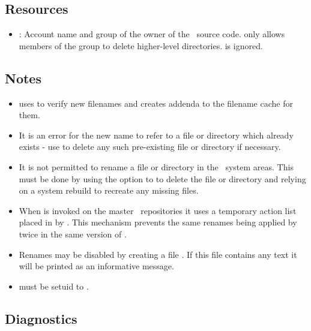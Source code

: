 \subsection*{Resources}

\begin{itemize}
\item
   : Account name and group of the owner of the
   \aipspp\ source code.   only allows members of the 
   group to delete higher-level directories.   is
   ignored.
\end{itemize}

\subsection*{Notes}

\begin{itemize}
\item
    uses  to verify new filenames and creates addenda to
   the  filename cache for them.

\item
   It is an error for the new name to refer to a file or directory which
   already exists - use  to delete any such pre-existing file or
   directory if necessary.

\item
   It is not permitted to rename a file or directory in the \aipspp\ system
   areas.  This must be done by using the  option to  to
   delete the file or directory and relying on a system rebuild to recreate
   any missing files.

\item
   When  is invoked on the master \rcs\ repositories
   it uses a temporary action list placed in  by
   .  This mechanism prevents the same renames being applied by
    twice in the same version of \aipspp.

\item
   Renames may be disabled by creating a file .
   If this file contains any text it will be printed as an informative
   message.

\item
    must be setuid to .
\end{itemize}

\subsection*{Diagnostics}

